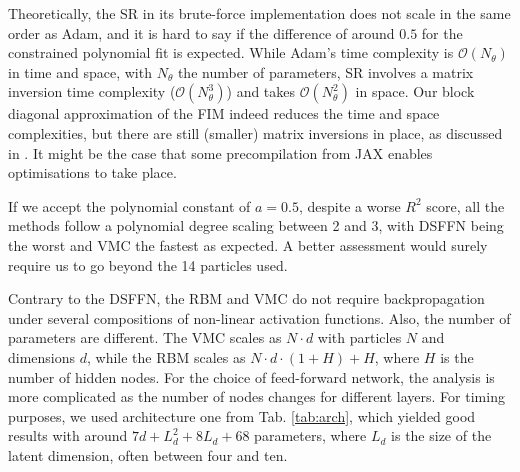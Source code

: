 Theoretically, the SR in its brute-force implementation does not scale in the same order as Adam, and it is hard to say if the difference of around $0.5$ for the constrained polynomial fit is expected. While Adam's time complexity is $\mathcal{O}(N_{\theta})$ in time and space, with $N_{\theta}$ the number of parameters, SR involves a matrix inversion time complexity ($\mathcal{O}(N_{\theta}^3)$) and takes $\mathcal{O}(N_{\theta}^2)$ in space. Our block diagonal approximation of the FIM indeed reduces the time and space complexities, but there are still (smaller) matrix inversions in place, as discussed in . It might be the case that some precompilation from JAX enables optimisations to take place.

If we accept the polynomial constant of $a = 0.5$, despite a worse $R^2$ score, all the methods follow a polynomial degree scaling between 2 and 3, with DSFFN being the worst and VMC the fastest as expected. A better assessment would surely require us to go beyond the 14 particles used.

Contrary to the DSFFN, the RBM and VMC do not require backpropagation under several compositions of non-linear activation functions. Also, the number of parameters are different. The VMC scales as $N\cdot d$ with particles $N$ and dimensions $d$, while the RBM scales as $N\cdot d \cdot (1 + H) + H$, where $H$ is the number of hidden nodes. For the choice of feed-forward network, the analysis is more complicated as the number of nodes changes for different layers. For timing purposes, we used architecture one from Tab. \ref{tab:arch}, which yielded good results with around $7d + L_d^2 + 8L_d +68$ parameters, where $L_d$ is the size of the latent dimension, often between four and ten.

